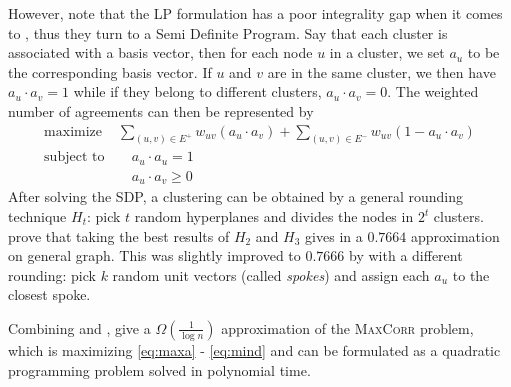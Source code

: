 However, \textcite[Theorem 2]{Charikar2003} note that the LP formulation has a poor integrality gap
when it comes to \maxa{}, thus they turn to a Semi Definite Program. Say that each cluster is
associated with a basis vector, then for each node $u$ in a cluster, we set $a_u$ to be the
corresponding basis vector. If $u$ and $v$ are in the same cluster, we then have $a_u\cdot a_v = 1$
while if they belong to different clusters, $a_u\cdot a_v = 0$. The weighted number of agreements
can then be represented by
\begin{align}
   \label{eq:maxaSDP}
   \text{maximize } & \sum_{(u,v)\in E^+} w_{uv}(a_u\cdot a_v) + \sum_{(u,v)\in E^-} w_{uv}(1-a_u\cdot a_v) \\
   \text{subject to}& \quad a_u\cdot a_u=1 \nonumber\\
   \phantom{subject to}& \quad a_u\cdot a_v\geq 0  \nonumber
\end{align}
After solving the SDP, a clustering can be obtained by a general rounding technique $H_t$: pick $t$
random hyperplanes and divides the nodes in $2^t$ clusters. \Textcite[Theorem 3]{Charikar2003} prove
that taking the best results of $H_2$ and $H_3$ gives in a $0.7664$ approximation on general graph.
This was slightly improved to $0.7666$ by \textcite{Swamy2004} with a different rounding: pick $k$
random unit vectors (called \emph{spokes}) and assign each $a_u$ to the closest spoke.

Combining \mind{} and \maxa{}, \textcite[Section 4]{Charikar2004} give a $\Omega(\frac{1}{\log n})$
approximation of the \textsc{MaxCorr} problem, which is maximizing \eqref{eq:maxa} - \eqref{eq:mind}
and can be formulated as a quadratic programming problem solved in polynomial time.

